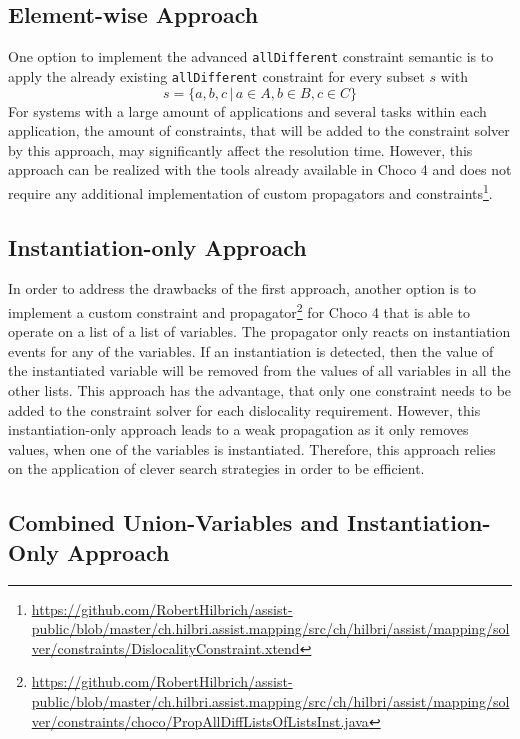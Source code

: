\documentclass[english,biblatex]{lni}
\begin{document}
\subsection*{Element-wise Approach}

One option to implement the advanced \texttt{allDifferent} constraint semantic is to apply the already existing \texttt{allDifferent} constraint for every subset $s$ with
$$s = \{a,b,c \, \vert \, a \in A,  b \in B, c \in C\}$$
For systems with a large amount of applications and several tasks within each application, the amount of constraints, that will be added to the constraint solver by this approach, may significantly affect the resolution time.
However, this approach can be realized with the tools already available in Choco 4 and does not require any additional implementation of custom propagators and constraints\footnote{\url{https://github.com/RobertHilbrich/assist-public/blob/master/ch.hilbri.assist.mapping/src/ch/hilbri/assist/mapping/solver/constraints/DislocalityConstraint.xtend}}.

\subsection*{Instantiation-only Approach}

In order to address the drawbacks of the first approach, another option is to implement a custom constraint and propagator\footnote{\url{https://github.com/RobertHilbrich/assist-public/blob/master/ch.hilbri.assist.mapping/src/ch/hilbri/assist/mapping/solver/constraints/choco/PropAllDiffListsOfListsInst.java}} for Choco 4 that is able to operate on a list of a list of variables.
The propagator only reacts on instantiation events for any of the variables.
If an instantiation is detected, then the value of the instantiated variable will be removed from the values of all variables in all the other lists.
This approach has the advantage, that only one constraint needs to be added to the constraint solver for each dislocality requirement.
However, this instantiation-only approach leads to a weak propagation as it only removes values, when one of the variables is instantiated.
Therefore, this approach relies on the application of clever search strategies in order to be efficient.

\subsection*{Combined Union-Variables and Instantiation-Only Approach}
\end{document}
